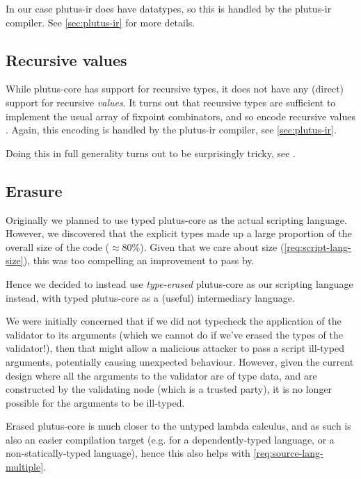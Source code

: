 \documentclass[plutus.tex]{subfiles}
\begin{document}
In our case \gls{plutus-ir} does have datatypes, so this is handled by the \gls{plutus-ir} compiler. See \cref{sec:plutus-ir} for more details.

\subsection{Recursive values}

While \gls{plutus-core} has support for recursive types, it does not have any (direct) support for recursive \emph{values}.
It turns out that recursive types are sufficient to implement the usual array of fixpoint combinators, and so encode recursive values \autocite{harper2012practical}.
Again, this encoding is handled by the \gls{plutus-ir} compiler, see \cref{sec:plutus-ir}.

Doing this in full generality turns out to be surprisingly tricky, see \textcite{peytonjones2019unraveling}.

\subsection{Erasure}
\label{sec:erasure}

Originally we planned to use typed \gls{plutus-core} as the actual scripting language.
However, we discovered that the explicit types made up a large proportion of the overall size of the code ($\approx 80\%$).
Given that we care about size (\cref{req:script-lang-size}), this was too compelling an improvement to pass by.

Hence we decided to instead use \emph{type-erased} \gls{plutus-core} as our scripting language instead, with typed \gls{plutus-core} as a (useful) intermediary language.

We were initially concerned that if we did not typecheck the application of the \gls{validator} to its arguments (which we cannot do if we've erased the types of the \gls{validator}!), then that might allow a malicious attacker to pass a script ill-typed arguments, potentially causing unexpected behaviour.
However, given the current design where all the arguments to the \gls{validator} are of type \gls{data}, and are constructed by the validating node (which is a trusted party), it is no longer possible for the arguments to be ill-typed.

Erased \gls{plutus-core} is much closer to the untyped lambda calculus, and as such is also an easier compilation target (e.g. for a dependently-typed language, or a non-statically-typed language), hence this also helps with \cref{req:source-lang-multiple}.
\end{document}
